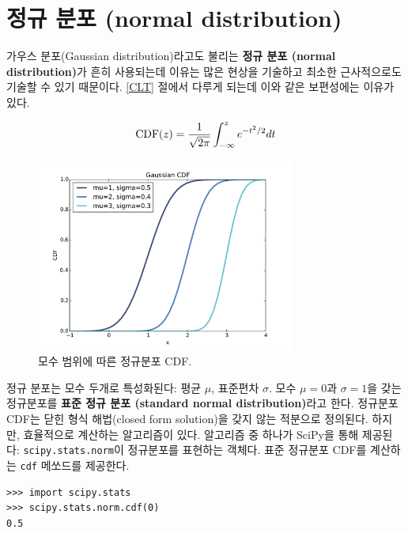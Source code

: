 \section{정규 분포 (normal distribution)}
\label{normal}

가우스 분포(Gaussian distribution)라고도 불리는 
{\bf 정규 분포 (normal distribution)}가 흔히 사용되는데 이유는 많은 현상을 기술하고 
최소한 근사적으로도 기술할 수 있기 때문이다.
\ref{CLT} 절에서 다루게 되는데 이와 같은 보편성에는 이유가 있다.

%
\[ \mathrm{CDF}(z) = \frac{1}{\sqrt{2 \pi}} \int_{-\infty}^z e^{-t^2/2} dt \]
%

\begin{figure}
\centerline{\includegraphics[height=2.5in]{figs/analytic_gaussian_cdf.pdf}}
\caption{모수 범위에 따른 정규분포 CDF.}
\label{analytic_gaussian_cdf}
\end{figure}

정규 분포는 모수 두개로 특성화된다: 평균 $\mu$, 표준편차 $\sigma$.
모수 $\mu=0$과 $\sigma=1$을 갖는 정규분포를 {\bf 표준 정규 분포 (standard normal
 distribution)}라고 한다.
정규분포 CDF는 닫힌 형식 해법(closed form solution)을 갖지 않는 적분으로 정의된다.
하지만, 효율적으로 계산하는 알고리즘이 있다.
알고리즘 중 하나가 SciPy을 통해 제공된다: {\tt scipy.stats.norm}이
정규분포를 표현하는 객체다. 표준 정규분포 CDF를 계산하는 {\tt cdf} 메쏘드를 제공한다.


\begin{verbatim}
>>> import scipy.stats
>>> scipy.stats.norm.cdf(0)
0.5
\end{verbatim}

